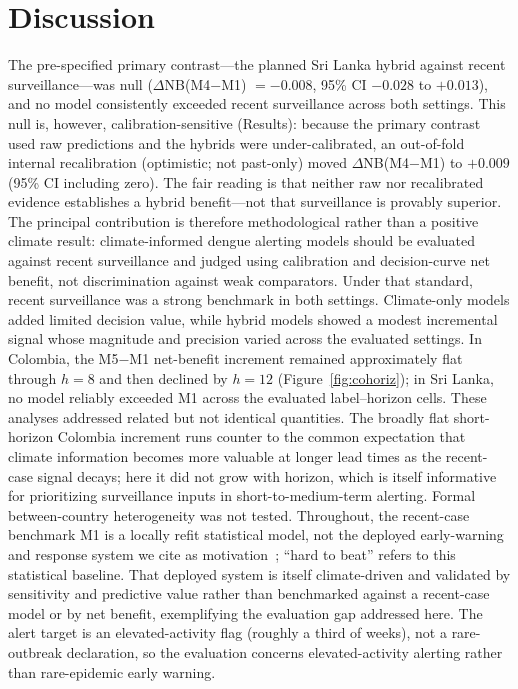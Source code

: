 \documentclass[11pt,a4paper]{article}
\begin{document}
\section{Discussion}

The pre-specified primary contrast---the planned Sri Lanka hybrid against recent surveillance---was null ($\Delta$NB(M4$-$M1) $=-0.008$, 95\% CI $-0.028$ to $+0.013$), and no model consistently exceeded recent surveillance across both settings. This null is, however, calibration-sensitive (Results): because the primary contrast used raw predictions and the hybrids were under-calibrated, an out-of-fold internal recalibration (optimistic; not past-only) moved $\Delta$NB(M4$-$M1) to $+0.009$ (95\% CI including zero). The fair reading is that neither raw nor recalibrated evidence establishes a hybrid benefit---not that surveillance is provably superior. The principal contribution is therefore methodological rather than a positive climate result: climate-informed dengue alerting models should be evaluated against recent surveillance and judged using calibration and decision-curve net benefit, not discrimination against weak comparators. Under that standard, recent surveillance was a strong benchmark in both settings. Climate-only models added limited decision value, while hybrid models showed a modest incremental signal whose magnitude and precision varied across the evaluated settings. In Colombia, the M5$-$M1 net-benefit increment remained approximately flat through $h=8$ and then declined by $h=12$ (Figure~\ref{fig:cohoriz}); in Sri Lanka, no model reliably exceeded M1 across the evaluated label--horizon cells. These analyses addressed related but not identical quantities. The broadly flat short-horizon Colombia increment runs counter to the common expectation that climate information becomes more valuable at longer lead times as the recent-case signal decays; here it did not grow with horizon, which is itself informative for prioritizing surveillance inputs in short-to-medium-term alerting. Formal between-country heterogeneity was not tested. Throughout, the recent-case benchmark M1 is a locally refit statistical model, not the deployed early-warning and response system we cite as motivation~\cite{EWARScsd}; ``hard to beat'' refers to this statistical baseline. That deployed system is itself climate-driven and validated by sensitivity and predictive value rather than benchmarked against a recent-case model or by net benefit, exemplifying the evaluation gap addressed here. The alert target is an elevated-activity flag (roughly a third of weeks), not a rare-outbreak declaration, so the evaluation concerns elevated-activity alerting rather than rare-epidemic early warning.
\end{document}
